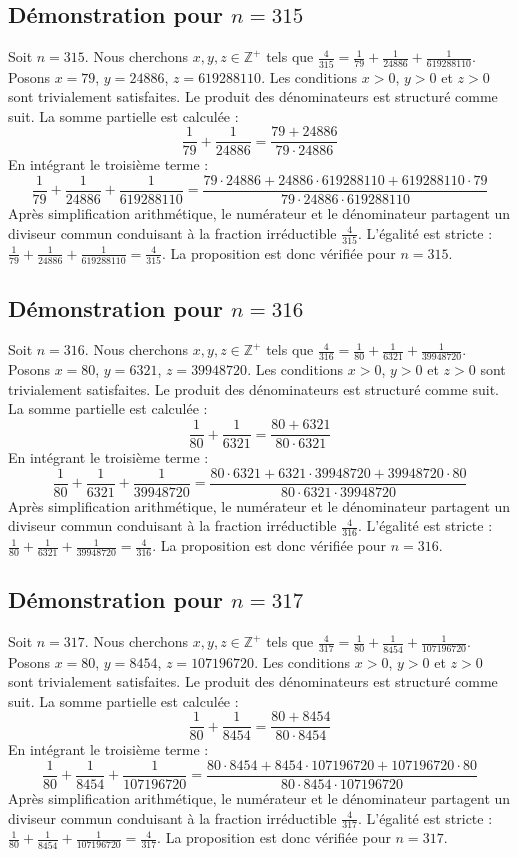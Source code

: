 \documentclass[11pt,a4paper]{article}
\begin{document}
\subsection{Démonstration pour $n = 315$}
Soit $n = 315$. Nous cherchons $x, y, z \in \mathbb{Z}^{+}$ tels que $\frac{4}{315} = \frac{1}{79} + \frac{1}{24886} + \frac{1}{619288110}$.
Posons $x = 79$, $y = 24886$, $z = 619288110$.
Les conditions $x > 0$, $y > 0$ et $z > 0$ sont trivialement satisfaites.
Le produit des dénominateurs est structuré comme suit. La somme partielle est calculée :
$$ \frac{1}{79} + \frac{1}{24886} = \frac{79+24886}{79 \cdot 24886} $$
En intégrant le troisième terme :
$$ \frac{1}{79} + \frac{1}{24886} + \frac{1}{619288110} = \frac{79 \cdot 24886 + 24886 \cdot 619288110 + 619288110 \cdot 79}{79 \cdot 24886 \cdot 619288110} $$
Après simplification arithmétique, le numérateur et le dénominateur partagent un diviseur commun conduisant à la fraction irréductible $\frac{4}{315}$.
L'égalité est stricte : $\frac{1}{79} + \frac{1}{24886} + \frac{1}{619288110} = \frac{4}{315}$.
La proposition est donc vérifiée pour $n = 315$.
\subsection{Démonstration pour $n = 316$}
Soit $n = 316$. Nous cherchons $x, y, z \in \mathbb{Z}^{+}$ tels que $\frac{4}{316} = \frac{1}{80} + \frac{1}{6321} + \frac{1}{39948720}$.
Posons $x = 80$, $y = 6321$, $z = 39948720$.
Les conditions $x > 0$, $y > 0$ et $z > 0$ sont trivialement satisfaites.
Le produit des dénominateurs est structuré comme suit. La somme partielle est calculée :
$$ \frac{1}{80} + \frac{1}{6321} = \frac{80+6321}{80 \cdot 6321} $$
En intégrant le troisième terme :
$$ \frac{1}{80} + \frac{1}{6321} + \frac{1}{39948720} = \frac{80 \cdot 6321 + 6321 \cdot 39948720 + 39948720 \cdot 80}{80 \cdot 6321 \cdot 39948720} $$
Après simplification arithmétique, le numérateur et le dénominateur partagent un diviseur commun conduisant à la fraction irréductible $\frac{4}{316}$.
L'égalité est stricte : $\frac{1}{80} + \frac{1}{6321} + \frac{1}{39948720} = \frac{4}{316}$.
La proposition est donc vérifiée pour $n = 316$.
\subsection{Démonstration pour $n = 317$}
Soit $n = 317$. Nous cherchons $x, y, z \in \mathbb{Z}^{+}$ tels que $\frac{4}{317} = \frac{1}{80} + \frac{1}{8454} + \frac{1}{107196720}$.
Posons $x = 80$, $y = 8454$, $z = 107196720$.
Les conditions $x > 0$, $y > 0$ et $z > 0$ sont trivialement satisfaites.
Le produit des dénominateurs est structuré comme suit. La somme partielle est calculée :
$$ \frac{1}{80} + \frac{1}{8454} = \frac{80+8454}{80 \cdot 8454} $$
En intégrant le troisième terme :
$$ \frac{1}{80} + \frac{1}{8454} + \frac{1}{107196720} = \frac{80 \cdot 8454 + 8454 \cdot 107196720 + 107196720 \cdot 80}{80 \cdot 8454 \cdot 107196720} $$
Après simplification arithmétique, le numérateur et le dénominateur partagent un diviseur commun conduisant à la fraction irréductible $\frac{4}{317}$.
L'égalité est stricte : $\frac{1}{80} + \frac{1}{8454} + \frac{1}{107196720} = \frac{4}{317}$.
La proposition est donc vérifiée pour $n = 317$.
\end{document}
